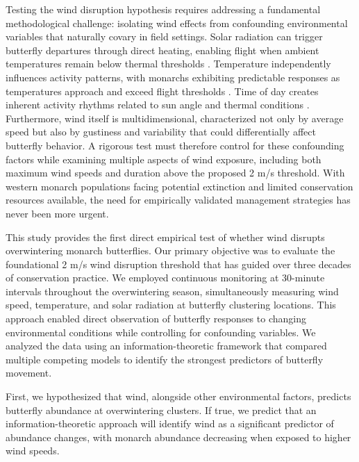 Testing the wind disruption hypothesis requires addressing a fundamental methodological challenge: isolating wind effects from confounding environmental variables that naturally covary in field settings. Solar radiation can trigger butterfly departures through direct heating, enabling flight when ambient temperatures remain below thermal thresholds \parencite{mastersMonarchButterflyDanaus1988,kammerThoracicTemperatureShivering1970}. Temperature independently influences activity patterns, with monarchs exhibiting predictable responses as temperatures approach and exceed flight thresholds \parencite{barkerEffectPhotoperiodTemperature1976}. Time of day creates inherent activity rhythms related to sun angle and thermal conditions \parencite{mouritsenVirtualMigrationTethered2002}. Furthermore, wind itself is multidimensional, characterized not only by average speed but also by gustiness and variability \parencite{nathanLongdistanceBiologicalTransport2005} that could differentially affect butterfly behavior. A rigorous test must therefore control for these confounding factors while examining multiple aspects of wind exposure, including both maximum wind speeds and duration above the proposed 2 m/s threshold. With western monarch populations facing potential extinction and limited conservation resources available, the need for empirically validated management strategies has never been more urgent.

This study provides the first direct empirical test of whether wind disrupts overwintering monarch butterflies. Our primary objective was to evaluate the foundational 2 m/s wind disruption threshold that has guided over three decades of conservation practice. We employed continuous monitoring at 30-minute intervals throughout the overwintering season, simultaneously measuring wind speed, temperature, and solar radiation at butterfly clustering locations. This approach enabled direct observation of butterfly responses to changing environmental conditions while controlling for confounding variables. We analyzed the data using an information-theoretic framework that compared multiple competing models to identify the strongest predictors of butterfly movement.

First, we hypothesized that wind, alongside other environmental factors, predicts butterfly abundance at overwintering clusters. If true, we predict that an information-theoretic approach will identify wind as a significant predictor of abundance changes, with monarch abundance decreasing when exposed to higher wind speeds.

